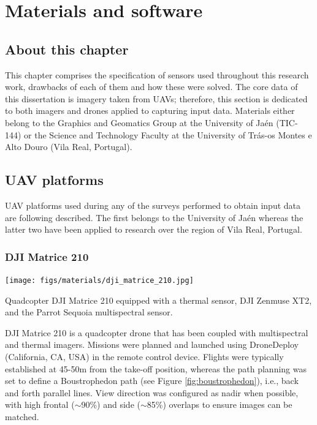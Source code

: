 \setchapterpreamble[u]{\margintoc}
\chapter{Materials and software}
\label{sec:materials}

\section*{About this chapter}

This chapter comprises the specification of sensors used throughout this research work, drawbacks of each of them and how these were solved. The core data of this dissertation is imagery taken from UAVs; therefore, this section is dedicated to both imagers and drones applied to capturing input data. Materials either belong to the Graphics and Geomatics Group at the University of Jaén (TIC-144) or the Science and Technology Faculty at the University of Trás-os Montes e Alto Douro (Vila Real, Portugal). 

\section{UAV platforms}

UAV platforms used during any of the surveys performed to obtain input data are following described. The first belongs to the University of Jaén whereas the latter two have been applied to research over the region of Vila Real, Portugal.

\subsection{DJI Matrice 210}

\begin{marginfigure}[.1cm]
	\texttt{[image: figs/materials/dji\_matrice\_210.jpg]}
	\caption{Quadcopter DJI Matrice 210 equipped with a thermal sensor, DJI Zenmuse XT2, and the Parrot Sequoia multispectral sensor.}
    \label{fig:dji_matrice_210}
\end{marginfigure}
DJI Matrice 210 is a quadcopter drone that has been coupled with multispectral and thermal imagers. Missions were planned and launched using DroneDeploy (California, CA, USA) in the remote control device. Flights were typically established at 45-50\si{\meter} from the take-off position, whereas the path planning was set to define a Boustrophedon path (see Figure \ref{fig:boustrophedon}), i.e., back and forth parallel lines. View direction was configured as nadir when possible, with high frontal ($\sim$90\%) and side ($\sim$85\%) overlaps to ensure images can be matched.


